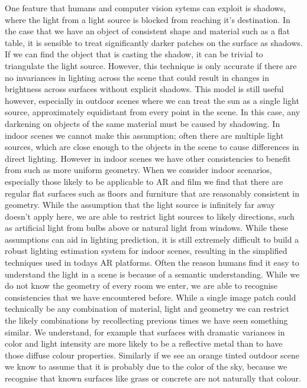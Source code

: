 \documentclass[ %
                    author={Gavin Parker},
                supervisor={Dr. Neill Campbell},
                    degree={MEng},
                     title={Deep Siamese Networks for Illumination Estimation from Stereo Images},
                  subtitle={},
                      type={research},
                      year={2018} ]{dissertation}
\begin{document}
One feature that humans and computer vision sytems can exploit is shadows, where the light from a light source is blocked from reaching it's destination. In the case that we have an object of consistent shape and material such as a flat table, it is sensible to treat significantly darker patches on the surface as shadows. If we can find the object that is casting the shadow, it can be trivial to triangulate the light source. However, this technique is only accurate if there are no invariances in lighting across the scene that could result in changes in brightness across surfaces without explicit shadows. This model is still useful however, especially in outdoor scenes where we can treat the sun as a single light source, approximately equidistant from every point in the scene. In this case, any darkening on objects of the same material must be caused by shadowing. In indoor scenes we cannot make this assumption; often there are multiple light sources, which are close enough to the objects in the scene to cause differences in direct lighting. However in indoor scenes we have other consistencies to benefit from such as more uniform geometry. When we consider indoor scenarios, especially those likely to be applicable to AR and film we find that there are regular flat surfaces such as floors and furniture that are reasonably consistent in geometry. While the assumption that the light source is infinitely far away doesn't apply here, we are able to restrict light sources to likely directions, such as artificial light from bulbs above or natural light from windows. While these assumptions can aid in lighting prediction, it is still extremely difficult to build a robust lighting estimation system for indoor scenes, resulting in the simplified techniques used in todays AR platforms.
\newline
Often the reason humans find it easy to understand the light in a scene is because of a semantic understanding. While we do not know the geometry of every room we enter, we are able to recognise consistencies that we have encountered before. While a single image patch could technically be any combination of material, light and geometry we can restrict the likely combinations by recollecting previous times we have seen something similar. We understand, for example that surfaces with dramatic variances in color and light intensity are more likely to be a reflective metal than to have those diffuse colour properties. Similarly if we see an orange tinted outdoor scene we know to assume that it is probably due to the color of the sky, because we recognise that known surfaces like grass or concrete are not naturally that colour.
\end{document}
